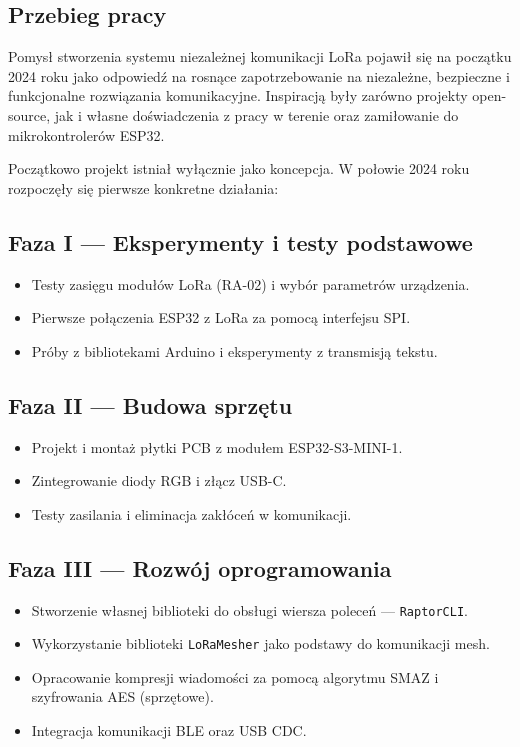 \subsection{Przebieg pracy}

Pomysł stworzenia systemu niezależnej komunikacji LoRa pojawił się na początku 2024 roku jako odpowiedź na rosnące zapotrzebowanie na niezależne, bezpieczne i funkcjonalne rozwiązania komunikacyjne. Inspiracją były zarówno projekty open-source, jak i własne doświadczenia z pracy w terenie oraz zamiłowanie do mikrokontrolerów ESP32.

Początkowo projekt istniał wyłącznie jako koncepcja. W połowie 2024 roku rozpoczęły się pierwsze konkretne działania:

\subsection*{Faza I --- Eksperymenty i testy podstawowe}

\begin{itemize}
	\item Testy zasięgu modułów LoRa (RA-02) i wybór parametrów urządzenia.
	\item Pierwsze połączenia ESP32 z LoRa za pomocą interfejsu SPI.
	\item Próby z bibliotekami Arduino i eksperymenty z transmisją tekstu.
\end{itemize}

\subsection*{Faza II --- Budowa sprzętu}

\begin{itemize}
	\item Projekt i montaż płytki PCB z modułem ESP32-S3-MINI-1.
	\item Zintegrowanie diody RGB i złącz USB-C.
	\item Testy zasilania i eliminacja zakłóceń w komunikacji.
\end{itemize}

\clearpage
\subsection*{Faza III --- Rozwój oprogramowania}

\begin{itemize}
	\item Stworzenie własnej biblioteki do obsługi wiersza poleceń --- \texttt{RaptorCLI}.
	\item Wykorzystanie biblioteki \texttt{LoRaMesher} jako podstawy do komunikacji mesh.
	\item Opracowanie kompresji wiadomości za pomocą algorytmu SMAZ i szyfrowania AES (sprzętowe).
	\item Integracja komunikacji BLE oraz USB CDC.
\end{itemize}

